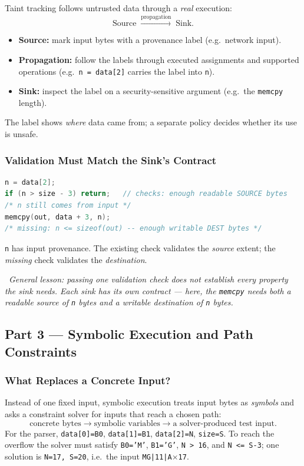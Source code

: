 \documentclass[hidelinks]{article}
\newcommand{\callout}[1]{\par\smallskip\noindent{\color{capri}$\blacktriangleright$}\ \textit{#1}\par\smallskip}
\begin{document}
Taint tracking follows untrusted data through a \emph{real} execution:
\[
\text{Source} \;\xrightarrow{\text{propagation}}\; \text{Sink}.
\]
\begin{itemize}
    \item \textbf{Source:} mark input bytes with a provenance label (e.g.\ network input).
    \item \textbf{Propagation:} follow the labels through executed assignments and supported operations (e.g.\ \texttt{n = data[2]} carries the label into \texttt{n}).
    \item \textbf{Sink:} inspect the label on a security-sensitive argument (e.g.\ the \texttt{memcpy} length).
\end{itemize}
The label shows \emph{where} data came from; a separate policy decides whether its use is unsafe.

\subsubsection{Validation Must Match the Sink's Contract}

\begin{lstlisting}[language=C]
n = data[2];
if (n > size - 3) return;   // checks: enough readable SOURCE bytes
/* n still comes from input */
memcpy(out, data + 3, n);
/* missing: n <= sizeof(out) -- enough writable DEST bytes */
\end{lstlisting}
\texttt{n} has input provenance. The existing check validates the \emph{source} extent; the \emph{missing} check validates the \emph{destination}.

\callout{General lesson: passing \emph{one} validation check does not establish \emph{every} property the sink needs. Each sink has its own contract --- here, the \texttt{memcpy} needs \emph{both} a readable source of \texttt{n} bytes \emph{and} a writable destination of \texttt{n} bytes.}

\subsection{Part 3 --- Symbolic Execution and Path Constraints}

\subsubsection{What Replaces a Concrete Input?}

Instead of one fixed input, symbolic execution treats input bytes as \emph{symbols} and asks a constraint solver for inputs that reach a chosen path:
\[
\text{concrete bytes} \to \text{symbolic variables} \to \text{a solver-produced test input}.
\]
For the parser, \texttt{data[0]=B0}, \texttt{data[1]=B1}, \texttt{data[2]=N}, \texttt{size=S}. To reach the overflow the solver must satisfy \texttt{B0='M'}, \texttt{B1='G'}, \texttt{N > 16}, and \texttt{N <= S-3}; one solution is \texttt{N=17, S=20}, i.e.\ the input \texttt{MG|11|A$\times$17}.
\end{document}
